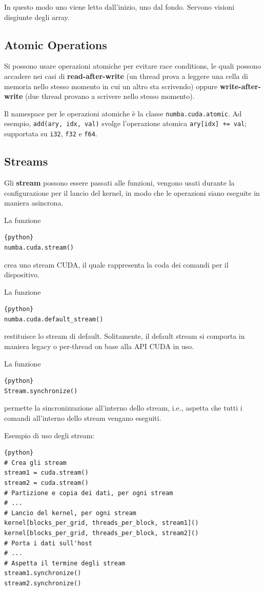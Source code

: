 In questo modo uno viene letto dall'inizio, uno dal fondo. Servono visioni disgiunte degli array.

\subsection{Atomic Operations}

Si possono usare operazioni atomiche per evitare race conditions, le quali possono accadere nei casi di \textbf{read-after-write} (un thread prova a leggere una cella di memoria nello stesso momento in cui un altro sta scrivendo) oppure \textbf{write-after-write} (due thread provano a scrivere nello stesso momento).

Il namespace per le operazioni atomiche è la classe \texttt{numba.cuda.atomic}. Ad esempio, \texttt{add(ary, idx, val)} svolge l'operazione atomica \texttt{ary[idx] += val}; supportata su \texttt{i32}, \texttt{f32} e \texttt{f64}.

\subsection{Streams}

Gli \textbf{stream} possono essere passati alle funzioni, vengono usati durante la configurazione per il lancio del kernel, in modo che le operazioni siano eseguite in maniera asincrona.

La funzione 
\begin{lstlisting}{python}
numba.cuda.stream()
\end{lstlisting}
crea uno stream CUDA, il quale rappresenta la coda dei comandi per il dispositivo.

La funzione
\begin{lstlisting}{python}
numba.cuda.default_stream()
\end{lstlisting}
restituisce lo stream di default. Solitamente, il default stream si comporta in maniera legacy o per-thread on base alla API CUDA in uso.

La funzione
\begin{lstlisting}{python}
Stream.synchronize()
\end{lstlisting}
permette la sincronizzazione all'interno dello stream, i.e., aspetta che tutti i comandi all'interno dello stream vengano eseguiti.

Esempio di uso degli stream:
\begin{lstlisting}{python}
# Crea gli stream
stream1 = cuda.stream()
stream2 = cuda.stream()
# Partizione e copia dei dati, per ogni stream
# ...
# Lancio del kernel, per ogni stream
kernel[blocks_per_grid, threads_per_block, stream1]()
kernel[blocks_per_grid, threads_per_block, stream2]()
# Porta i dati sull'host
# ...
# Aspetta il termine degli stream
stream1.synchronize()
stream2.synchronize()
\end{lstlisting}

